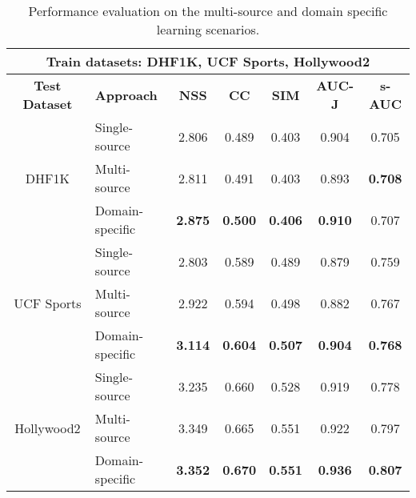    \begin{table*}[ht!]
        \centering
        \begin{tabular}{c|lccccc}
            \toprule
            \multicolumn{7}{c}{\textbf{Train datasets: DHF1K, UCF Sports, Hollywood2}} \\ 
            \midrule
            \textbf{Test Dataset} &\textbf{Approach} & \textbf{NSS} & \textbf{CC} & \textbf{SIM} & \textbf{AUC-J} & \textbf{s-AUC} \\
            \midrule
            \multirow{3}{*}{DHF1K} & Single-source & 2.806 & 0.489 & 0.403 & 0.904 & 0.705 \\
            & Multi-source   & 2.811 & 0.491 & 0.403 & 0.893 & \textbf{0.708} \\
            & Domain-specific  & \textbf{2.875} &  \textbf{0.500} & \textbf{0.406} &  \textbf{0.910} & 0.707 \\
            \midrule
            \multirow{3}{*}{UCF Sports} & Single-source & 2.803 & 0.589 & 0.489 & 0.879 & 0.759 \\
            & Multi-source  &  2.922 & 0.594 & 0.498 & 0.882 & 0.767 \\
            &Domain-specific  & \textbf{3.114} &  \textbf{0.604} & \textbf{0.507} &  \textbf{0.904} & \textbf{0.768} \\
            \midrule
            \multirow{3}{*}{Hollywood2} & Single-source & 3.235 & 0.660 & 0.528 & 0.919 & 0.778 \\
            &Multi-source  &  3.349 & 0.665 & 0.551 & 0.922 & 0.797 \\
            &Domain-specific  & \textbf{3.352} &  \textbf{0.670}   & \textbf{0.551} &  \textbf{0.936} & \textbf{0.807} \\
            \bottomrule
        \end{tabular}
        \caption{Performance evaluation on the multi-source and domain specific learning scenarios.}
        \label{tab:supervised}
    \end{table*}































































